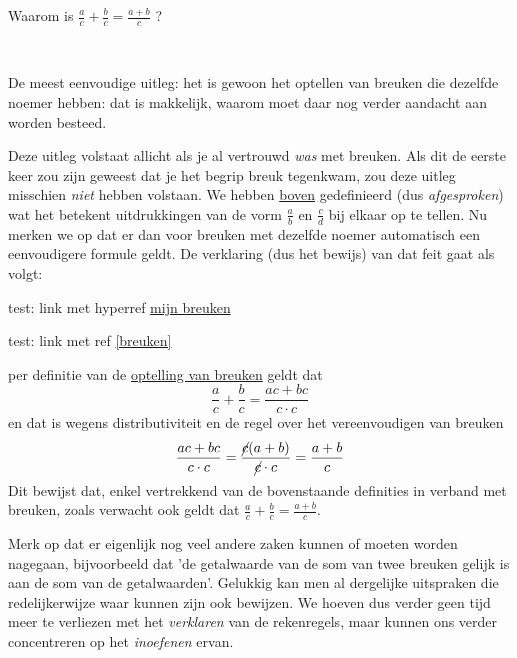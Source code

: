 \documentclass{ximera}
\begin{document}
\begin{xmuitweiding} %
	Waarom is $\frac{a}{c}+\frac{b}{c} = \frac{a+b}{c}$ ?
	\begin{expandable}
	\begin{explanation} \ 
		
		De meest eenvoudige uitleg: het is gewoon het optellen van breuken die dezelfde noemer hebben: dat is makkelijk, waarom moet daar nog verder aandacht aan worden besteed.

		Deze uitleg volstaat allicht als je al vertrouwd \textit{was} met breuken. Als dit de eerste keer zou zijn geweest dat je het begrip breuk tegenkwam, zou deze uitleg misschien \textit{niet} hebben volstaan. We hebben \hyperref[def:optelling breuken]{boven} gedefinieerd (dus \textit{afgesproken}) wat het betekent uitdrukkingen van de vorm $\frac{a}{b}$ en $\frac{c}{d}$ bij elkaar op te tellen. Nu merken we op dat er dan voor breuken met dezelfde noemer automatisch een eenvoudigere formule geldt. De verklaring (dus het bewijs) van dat feit gaat als volgt: 		
		
        test: link met hyperref \hyperref[breuken]{mijn breuken}
        
        test: link met ref \ref{breuken}
        
		per definitie van de \hyperref[def:optelling breuken]{optelling van breuken} geldt dat 
		$$ \frac{a}{c}+\frac{b}{c} = \frac{ac+bc}{c\cdot c}$$
		en dat is wegens distributiviteit en de regel over het vereenvoudigen van breuken
		$$ \frac{ac+bc}{c\cdot c} = \frac{\cancel{c}(a+b)}{\cancel{c} \cdot c} = \frac{a+b}{c}$$
		Dit bewijst dat, enkel vertrekkend van de bovenstaande definities in verband met breuken, zoals verwacht ook geldt dat $\frac{a}{c}+\frac{b}{c} = \frac{a+b}{c}$.
        
        Merk op dat er eigenlijk nog veel andere zaken kunnen of moeten worden nagegaan, bijvoorbeeld dat 'de getalwaarde van de som van twee breuken gelijk is aan de som van de getalwaarden'. Gelukkig kan men al dergelijke uitspraken die redelijkerwijze waar kunnen zijn ook bewijzen. We hoeven dus verder geen tijd meer te verliezen met het \textit{verklaren} van de rekenregels, maar kunnen ons verder concentreren op het \textit{inoefenen} ervan.
	\end{explanation}
	
\end{expandable}
\end{xmuitweiding}
\end{document}
